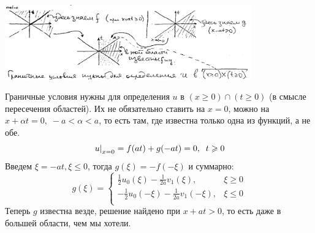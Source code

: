 \documentclass[../main.tex]{subfiles}
\begin{document}
\begin{center}
\includegraphics[width=0.8\textwidth]{4_1_new}
\end{center}

Граничные условия нужны для определения $u$ в $(x \geq 0)\cap(t \geq 0)$ (в смысле пересечения областей). Их не обязательно ставить на $x=0$, можно на $x + \alpha t = 0, \; -a < \alpha < a$, то есть там, где известна только одна из функций, а не обе.
$$
\left. u\right|_{x=0} = f(at) + g(-at)=0, \;\; t \geqslant 0
$$
Введем $\xi = -at, \xi \leq 0$, тогда $g(\xi) = -f(-\xi)$ и суммарно:
\begin{equation*}
    g(\xi) = \begin{cases}
        \frac{1}{2}u_0(\xi)-\frac{1}{2a}v_1(\xi), & \xi \geq 0\\
        -\frac{1}{2}u_0(-\xi)-\frac{1}{2a}v_1(-\xi), & \xi \leq 0\\
    \end{cases}
\end{equation*}
Теперь $g$ известна везде, решение найдено при $x + at > 0$, то есть даже в большей области, чем мы хотели.

\begin{center}
\end{center}
\end{document}
